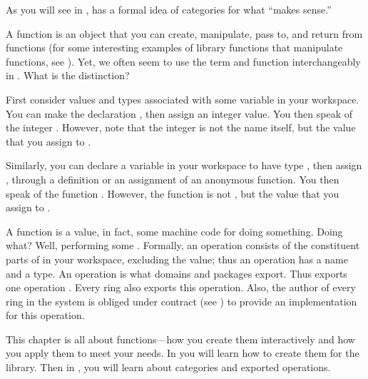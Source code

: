 As you will see in ,
\Language{} has a formal idea of categories for what ``makes sense.''


A function is an object that you can create, manipulate, pass to,
and return from functions (for some interesting examples of
library functions that manipulate functions, see
).
Yet, we often seem to use the term  and
function interchangeably in \Language{}.
What is the distinction?

First consider values and types associated with some variable  in
your workspace.
You can make the declaration , then assign  an
integer value.
You then speak of the integer .
However, note that the integer is not the name  itself, but
the value that you assign to .

Similarly, you can declare a variable  in your workspace to have
type , then assign , through a definition
or an assignment of an anonymous function.
You then speak of the function .
However, the function is not , but the value that you
assign to .

A function is a value, in fact, some machine code for doing something.
Doing what?
Well, performing some .
Formally, an operation consists of the constituent parts of  in your
workspace, excluding the value; thus an operation has a name and a type.
An operation is what domains and packages export.
Thus  exports one operation \spadop{+}.
Every ring also exports this operation.
Also, the author of every ring in the system is obliged under contract
(see )
to provide an implementation for this operation.

This chapter is all about functions---how you create them interactively and
how you apply them to meet your needs.
In  you will learn how to create them for the
\Language{} library.
Then in , you will learn about categories and
exported operations.


